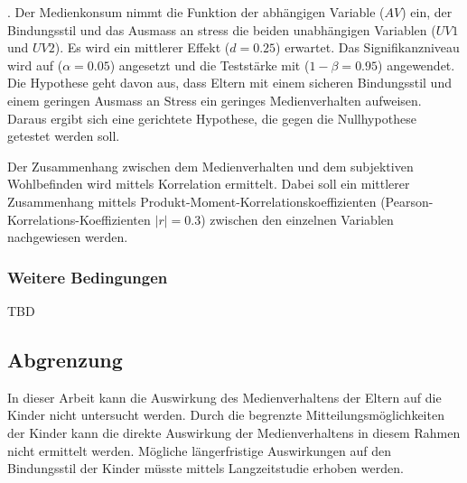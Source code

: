 . Der Medienkonsum nimmt die Funktion der abhängigen Variable ($AV$) ein, der Bindungsstil und das Ausmass an stress die beiden unabhängigen Variablen ($UV1$ und $UV2$). Es wird ein mittlerer Effekt ($d=0.25$) erwartet. Das Signifikanzniveau wird auf ($\alpha=0.05$) angesetzt und die Teststärke mit ($1-\beta=0.95$) angewendet.
Die Hypothese geht davon aus, dass Eltern mit einem sicheren Bindungsstil und einem geringen Ausmass an Stress ein geringes Medienverhalten aufweisen. Daraus ergibt sich eine gerichtete Hypothese, die gegen die Nullhypothese getestet werden soll.

Der Zusammenhang zwischen dem Medienverhalten und dem subjektiven Wohlbefinden wird mittels Korrelation ermittelt. Dabei soll ein mittlerer Zusammenhang mittels Produkt-Moment-Korrelationskoeffizienten (Pearson-Korrelations-Koeffizienten $|r|=0.3$) zwischen den einzelnen Variablen nachgewiesen werden.

\subsubsection{Weitere Bedingungen}
TBD
\subsection{Abgrenzung}
In dieser Arbeit kann die Auswirkung des Medienverhaltens der Eltern auf die Kinder nicht untersucht werden. Durch die begrenzte Mitteilungsmöglichkeiten der Kinder kann die direkte Auswirkung der Medienverhaltens in diesem Rahmen nicht ermittelt werden. Mögliche längerfristige Auswirkungen auf den Bindungsstil der Kinder müsste mittels Langzeitstudie erhoben werden. 
